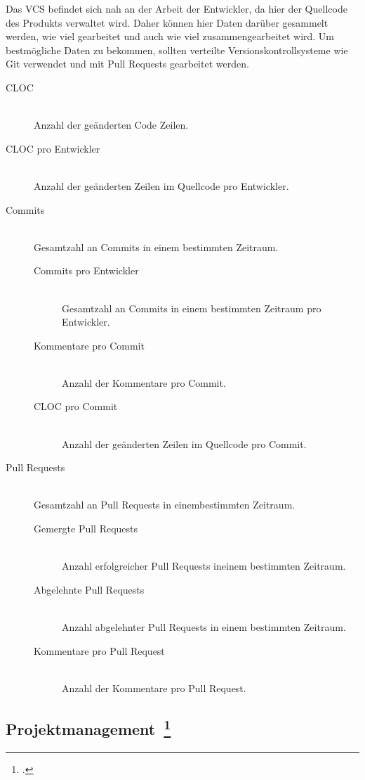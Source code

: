 Das \ac{VCS} befindet sich nah an der Arbeit der Entwickler, da hier der Quellcode des Produkts verwaltet wird.
Daher können hier Daten darüber gesammelt werden, wie viel gearbeitet und auch wie viel zusammengearbeitet wird.
Um bestmögliche Daten zu bekommen, sollten verteilte Versionskontrollsysteme wie Git verwendet und mit Pull Requests gearbeitet werden.

\begin{description}
  \item[\ac{CLOC}] \hfill \\ Anzahl der geänderten Code Zeilen.
  \item[\ac{CLOC} pro Entwickler] \hfill \\ Anzahl der geänderten Zeilen im Quellcode pro Entwickler.
  \item[Commits] \hfill \\ Gesamtzahl an Commits in einem bestimmten Zeitraum.
  \begin{description}
    \item[Commits pro Entwickler] \hfill \\ Gesamtzahl an Commits in einem bestimmten Zeitraum pro Entwickler.
    \item[Kommentare pro Commit] \hfill \\ Anzahl der Kommentare pro Commit.
    \item[\ac{CLOC} pro Commit] \hfill \\ Anzahl der geänderten Zeilen im Quellcode pro Commit.
  \end{description}
  \item[Pull Requests] \hfill \\ Gesamtzahl an Pull Requests in einembestimmten Zeitraum.
  \begin{description}
    \item[Gemergte Pull Requests] \hfill \\ Anzahl erfolgreicher Pull Requests ineinem bestimmten Zeitraum.
    \item[Abgelehnte Pull Requests] \hfill \\ Anzahl abgelehnter Pull Requests in einem bestimmten Zeitraum.
    \item[Kommentare pro Pull Request] \hfill \\ Anzahl der Kommentare pro Pull Request.
  \end{description}
\end{description}

\newpage
\subsection[Projektmanagement]{Projektmanagement~\footcite[vgl.][S.37ff]{davis_agile_2015}}

